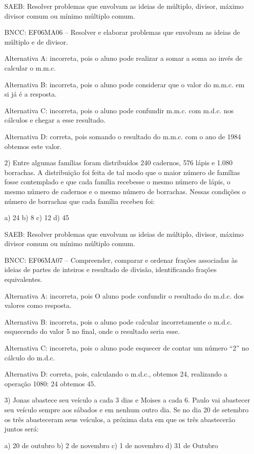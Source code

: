 SAEB: Resolver problemas que envolvam as ideias de múltiplo, divisor,
máximo divisor comum ou mínimo múltiplo comum.

BNCC: EF06MA06 -- Resolver e elaborar problemas que envolvam as ideias
de múltiplo e de divisor.

Alternativa A: incorreta, pois o aluno pode realizar a somar a soma ao
invés de calcular o m.m.c.

Alternativa B: incorreta, pois o aluno pode considerar que o valor do
m.m.c. em si já é a resposta.

Alternativa C: incorreta, pois o aluno pode confundir m.m.c. com m.d.c.
nos cálculos e chegar a esse resultado.

Alternativa D: correta, pois somando o resultado do m.m.c. com o ano de
1984 obtemos este valor.

2) Entre algumas famílias foram distribuídos 240 cadernos, 576 lápis e
1.080 borrachas. A distribuição foi feita de tal modo que o maior número
de famílias fosse contemplado e que cada família recebesse o mesmo
número de lápis, o mesmo número de cadernos e o mesmo número de
borrachas. Nessas condições o número de borrachas que cada família
recebeu foi:

a) 24 b) 8 c) 12 d) 45

SAEB: Resolver problemas que envolvam as ideias de múltiplo, divisor,
máximo divisor comum ou mínimo múltiplo comum.

BNCC: EF06MA07 -- Compreender, comparar e ordenar frações associadas às
ideias de partes de inteiros e resultado de divisão, identificando
frações equivalentes.

Alternativa A: incorreta, pois O aluno pode confundir o resultado do
m.d.c. dos valores como resposta.

Alternativa B: incorreta, pois o aluno pode calcular incorretamente o
m.d.c. esquecendo do valor 5 no final, onde o resultado seria esse.

Alternativa C: incorreta, pois o aluno pode esquecer de contar um número
``2'' no cálculo do m.d.c.

Alternativa D: correta, pois, calculando o m.d.c., obtemos 24,
realizando a operação 1080: 24 obtemos 45.

3) Jonas abastece seu veículo a cada 3 dias e Moises a cada 6. Paulo vai
abastecer seu veículo sempre aos sábados e em nenhum outro dia. Se no
dia 20 de setembro os três abasteceram seus veículos, a próxima data em
que os três abastecerão juntos será:

a) 20 de outubro b) 2 de novembro c) 1 de novembro d) 31 de Outubro


